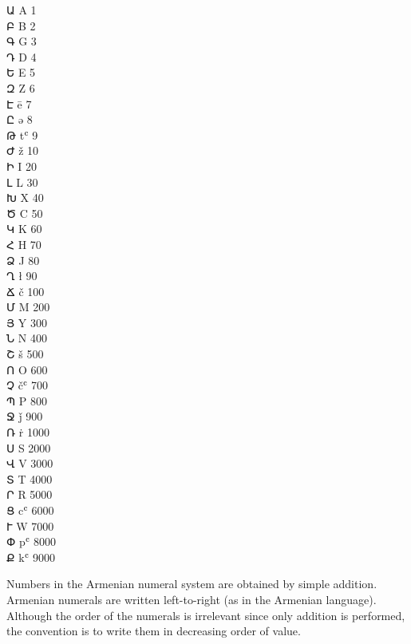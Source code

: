 \begin{multicols}{4}
\m Ա	A	1\\
\m Բ	B	2\\
\m Գ	G	3\\
\m Դ	D	4\\
\m Ե	E	5\\
\m Զ	Z	6\\
\m Է	ē	7\\
\m Ը	ə	8\\
\m Թ	tʿ	9\\
\m Ժ	ž	10\\
\m Ի	I	20\\
\m Լ	L	30\\
\m Խ	X	40\\
\m Ծ	C	50\\
\m Կ	K	60\\
\m Հ	H	70\\
\m Ձ	J	80\\
\m Ղ	ł	90\\
\m Ճ	č	100\\
\m Մ	M	200\\
\m Յ	Y	300\\
\m Ն	N	400\\
\m Շ	š	500\\
\m Ո	O	600\\
\m Չ	čʿ	700\\
\m Պ	P	800\\
\m Ջ	ǰ	900\\
\m Ռ	ṙ	1000\\ 
\m Ս	S	2000\\
\m Վ	V	3000\\
\m Տ	T	4000\\
\m Ր	R	5000\\
\m Ց	cʿ	6000\\
\m Ւ	W	7000\\
\m Փ	pʿ	8000\\
\m Ք	kʿ	9000\\

\end{multicols}

\medskip

Numbers in the Armenian numeral system are obtained by simple addition. Armenian numerals are written left-to-right (as in the Armenian language). Although the order of the numerals is irrelevant since only addition is performed, the convention is to write them in decreasing order of value.

